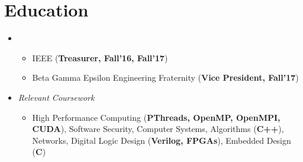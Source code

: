 \documentclass[11pt,letterpaper,sans]{moderncv}
\begin{document}
\makecvtitle

\vspace{-40pt}





\section{Education}
\vspace{5pt}


\begin{itemize}

\item[] {}
\vspace{-1mm}	\begin{itemize}
	 \item IEEE (\textbf{Treasurer, Fall'16, Fall'17})
	 \item Beta Gamma Epsilon Engineering Fraternity (\textbf{Vice President, Fall'17})
	\end{itemize}
	
\item[] {\textit{Relevant Coursework}}
\vspace{-1mm} \begin{itemize}
               \item High Performance Computing (\textbf{PThreads, OpenMP, OpenMPI, CUDA}), 
               Software Security, 
               Computer Systems,
               Algorithms (\textbf{C++}), 
               Networks, 
               Digital Logic Design 
               (\textbf{Verilog, FPGAs}), 
               Embedded Design (\textbf{C})
              \end{itemize}


\end{itemize}
\end{document}
